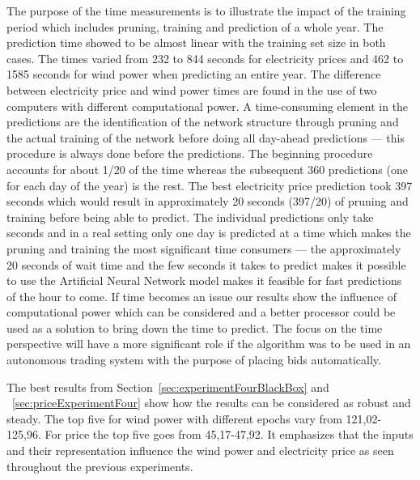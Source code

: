The purpose of the time measurements is to illustrate the impact of the training period which includes pruning, training and prediction of a whole year. The prediction time showed to be almost linear with the training set size in both cases. The times varied from 232 to 844 seconds for electricity prices and 462 to 1585 seconds for wind power when predicting an entire year. The difference between electricity price and wind power times are found in the use of two computers with different computational power. A time-consuming element in the predictions are the identification of the network structure through pruning and the actual training of the network before doing all day-ahead predictions --- this procedure is always done before the predictions. The beginning procedure accounts for about 1/20 of the time whereas the subsequent 360 predictions (one for each day of the year) is the rest. The best electricity price prediction took 397 seconds which would result in approximately 20 seconds (397/20) of pruning and training before being able to predict. The individual predictions only take seconds and in a real setting only one day is predicted at a time which makes the pruning and training the most significant time consumers --- the approximately 20 seconds of wait time and the few seconds it takes to predict makes it possible to use the Artificial Neural Network model makes it feasible for fast predictions of the hour to come. If time becomes an issue our results show the influence of computational power which can be considered and a better processor could be used as a solution to bring down the time to predict. The focus on the time perspective will have a more significant role if the algorithm was to be used in an autonomous trading system with the purpose of placing bids automatically.  

The best results from Section~\ref{sec:experimentFourBlackBox} and ~\ref{sec:priceExperimentFour} show how the results can be considered as robust and steady. The top five for wind power with different epochs vary from 121,02-125,96. For price the top five goes from 45,17-47,92. It emphasizes that the inputs and their representation influence the wind power and electricity price as seen throughout the previous experiments.

